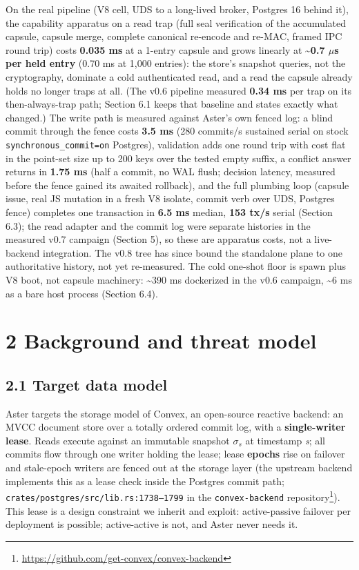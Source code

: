 \documentclass[
  11pt,
]{article}
\begin{document}
On the real pipeline (V8 cell, UDS to a long-lived broker, Postgres 16 behind it), the capability apparatus on a read trap (full seal verification of the accumulated capsule, capsule merge, complete canonical re-encode and re-MAC, framed IPC round trip) costs \textbf{0.035 ms} at a 1-entry capsule and grows linearly at \textbf{\textasciitilde0.7 $\mu$s per held entry} (0.70 ms at 1,000 entries): the store's snapshot queries, not the cryptography, dominate a cold authenticated read, and a read the capsule already holds no longer traps at all. (The v0.6 pipeline measured \textbf{0.34 ms} per trap on its then-always-trap path; Section 6.1 keeps that baseline and states exactly what changed.) The write path is measured against Aster's own fenced log: a blind commit through the fence costs \textbf{3.5 ms} (280 commits/s sustained serial on stock \texttt{synchronous\_commit=on} Postgres), validation adds one round trip with cost flat in the point-set size up to 200 keys over the tested empty suffix, a conflict answer returns in \textbf{1.75 ms} (half a commit, no WAL flush; decision latency, measured before the fence gained its awaited rollback), and the full plumbing loop (capsule issue, real JS mutation in a fresh V8 isolate, commit verb over UDS, Postgres fence) completes one transaction in \textbf{6.5 ms} median, \textbf{153 tx/s} serial (Section 6.3); the read adapter and the commit log were separate histories in the measured v0.7 campaign (Section 5), so these are apparatus costs, not a live-backend integration. The v0.8 tree has since bound the standalone plane to one authoritative history, not yet re-measured. The cold one-shot floor is spawn plus V8 boot, not capsule machinery: \textasciitilde390 ms dockerized in the v0.6 campaign, \textasciitilde6 ms as a bare host process (Section 6.4).

\section{2 Background and threat model}\label{background-and-threat-model}

\subsection{2.1 Target data model}\label{target-data-model}

Aster targets the storage model of Convex, an open-source reactive backend: an MVCC document store over a totally ordered commit log, with a \textbf{single-writer lease}. Reads execute against an immutable snapshot $\sigma_s$ at timestamp \emph{s}; all commits flow through one writer holding the lease; lease \textbf{epochs} rise on failover and stale-epoch writers are fenced out at the storage layer (the upstream backend implements this as a lease check inside the Postgres commit path; \texttt{crates/postgres/src/lib.rs:1738--1799} in the \texttt{convex-backend} repository\footnote{\url{https://github.com/get-convex/convex-backend}}). This lease is a design constraint we inherit and exploit: active-passive failover per deployment is possible; active-active is not, and Aster never needs it.
\end{document}
